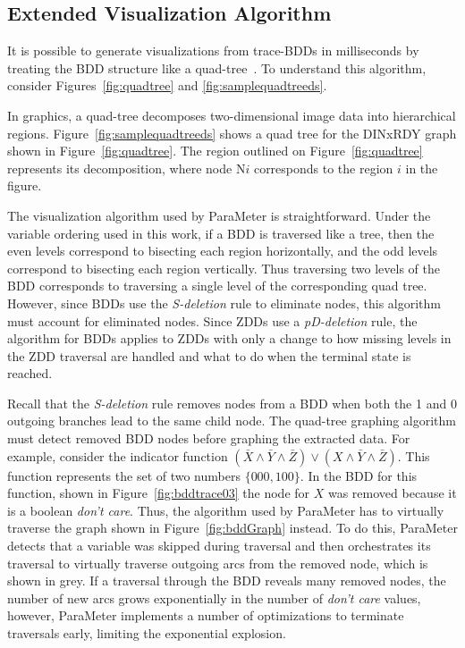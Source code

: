 {\subsection{Extended Visualization Algorithm}

It is possible to generate visualizations from trace-BDDs in milliseconds by treating the BDD structure like a quad-tree~\cite{price:08:pact}.  To understand this algorithm, consider Figures~\ref{fig:quadtree} and \ref{fig:samplequadtreeds}.

In graphics, a quad-tree decomposes two-dimensional image data into hierarchical regions. Figure~\ref{fig:samplequadtreeds} shows a quad tree for the DINxRDY graph shown in Figure~\ref{fig:quadtree}.  The region outlined on Figure~\ref{fig:quadtree} represents its decomposition, where node N$i$ corresponds to the region $i$ in the figure.

The visualization algorithm used by ParaMeter is straightforward. Under the variable ordering used in this work, if a BDD is traversed like a tree, then the even levels correspond to bisecting each region horizontally, and the odd levels correspond to bisecting each region vertically.  Thus traversing two levels of the BDD corresponds to traversing a single level of the corresponding quad tree.  However, since BDDs use the \textit{S-deletion} rule to eliminate nodes, this algorithm must account for eliminated nodes.  Since ZDDs use a \textit{pD-deletion} rule, the algorithm for BDDs applies to ZDDs with only a change to how missing levels in the ZDD traversal are handled and what to do when the terminal state is reached.

Recall that the \textit{S-deletion} rule removes nodes from a BDD when both the 1 and 0 outgoing branches lead to the same child node.  The quad-tree graphing algorithm must detect removed BDD nodes before graphing the extracted data.  For example, consider the indicator function $(\bar{X}\land\bar{Y}\land\bar{Z})\lor(X\land\bar{Y}\land\bar{Z})$. This function represents the set of two numbers $\{000, 100\}$.  In the BDD for this function, shown in Figure~\ref{fig:bddtrace03} the node for $X$ was removed because it is a boolean \textit{don't care}. Thus, the algorithm used by ParaMeter has to virtually traverse the graph shown in Figure~\ref{fig:bddGraph} instead.  To do this, ParaMeter detects that a variable was skipped during traversal and then orchestrates its traversal to virtually traverse outgoing arcs from the removed node, which is shown in grey.  If a traversal through the BDD reveals many removed nodes, the number of new arcs grows exponentially in the number of \textit{don't care} values, however, ParaMeter implements a number of optimizations to terminate traversals early, limiting the exponential explosion.

}
